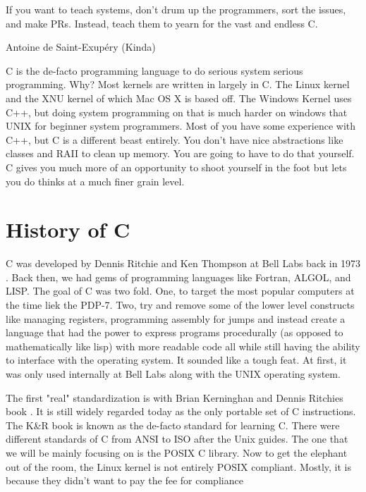 
\epigraph{If you want to teach systems, don't drum up the programmers, sort the issues, and make PRs. Instead, teach them to yearn for the vast and endless C.}{Antoine de Saint-Exup\'{e}ry (Kinda)}

C is the de-facto programming language to do serious system serious programming. Why? Most kernels are written in largely in C. The Linux kernel \cite{Love} and the XNU kernel \citet{xnukernel} of which Mac OS X is based off. The Windows Kernel uses C++, but doing system programming on that is much harder on windows that UNIX for beginner system programmers. Most of you have some experience with C++, but C is a different beast entirely. You don't have nice abstractions like classes and RAII to clean up memory. You are going to have to do that yourself. C gives you much more of an opportunity to shoot yourself in the foot but lets you do thinks at a much finer grain level.

\section{History of C}

C was developed by Dennis Ritchie and Ken Thompson at Bell Labs back in 1973 \cite{Ritchie:1993:DCL:155360.155580}. Back then, we had gems of programming languages like Fortran, ALGOL, and LISP. The goal of C was two fold. One, to target the most popular computers at the time liek the PDP-7. Two, try and remove some of the lower level constructs like managing registers, programming assembly for jumps and instead create a language that had the power to express programs procedurally (as opposed to mathematically like lisp) with more readable code all while still having the ability to interface with the operating system. It sounded like a tough feat. At first, it was only used internally at Bell Labs along with the UNIX operating system. 

The first "real" standardization is with Brian Kerninghan and Dennis Ritchies book \cite{kernighan1988c}. It is still widely regarded today as the only \gls{portable} set of C instructions. The K\&R book is known as the de-facto standard for learning C.  There were different standards of C from ANSI to ISO after the Unix guides. The one that we will be mainly focusing on is the \gls{POSIX} C library. Now to get the elephant out of the room, the Linux kernel is not entirely POSIX compliant. Mostly, it is because they didn't want to pay the fee for compliance

\todo

